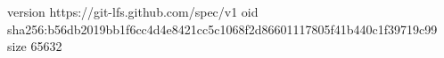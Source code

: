 version https://git-lfs.github.com/spec/v1
oid sha256:b56db2019bb1f6cc4d4e8421cc5c1068f2d86601117805f41b440c1f39719c99
size 65632
